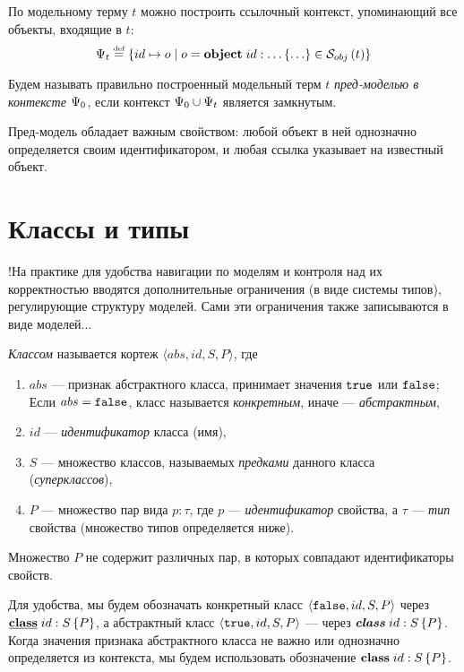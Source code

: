 По модельному терму $t$ можно построить ссылочный контекст, упоминающий все объекты, входящие в $t$:
$$
	\Psi_t \stackrel{\text{\tiny def}}{=} \left\{ id \mapsto o \;|\; o = \mathbf{object}\;id : \ldots\left\{ \ldots \right\} \in \mathcal{S}_{obj}\left(t\right)\right\}
$$

\begin{Def}
Будем называть правильно построенный модельный терм $t$ \emph{пред-моделью в контексте $\Psi_0$}, если контекст $\Psi_0 \cup \Psi_t$ является замкнутым.
\end{Def}

Пред-модель обладает важным свойством: любой объект в ней однозначно определяется своим идентификатором, и любая ссылка указывает на известный объект.

\section{Классы и типы}

!На практике для удобства навигации по моделям и контроля над их корректностью вводятся дополнительные ограничения (в виде системы типов), регулирующие структуру моделей. Сами эти ограничения также записываются в виде моделей...

\begin{Def}[Класс]
\emph{Классом} называется кортеж $\langle abs, id, S, P \rangle$, где 
\begin{enumerate}
\item $abs$ --- признак абстрактного класса, принимает значения $\mathtt{true}$ или $\mathtt{false}$; Если $abs = \mathtt{false}$, класс называется \emph{конкретным}, иначе --- \emph{абстрактным},
\item $id$ --- \emph{идентификатор} класса (имя),
\item $S$ --- множество классов, называемых \emph{предками} данного класса (\emph{суперклассов}),
\item $P$ --- множество пар вида $p : \tau$, где $p$ --- \emph{идентификатор} свойства, а $\tau$ --- \emph{тип} свойства (множество типов определяется ниже).
\end{enumerate}
Множество $P$ не содержит различных пар, в которых совпадают идентификаторы свойств.
\end{Def}

Для удобства, мы будем обозначать конкретный класс $\langle \mathtt{false}, id, S, P \rangle$ через \mbox{$\underline{\mathbf{class}}\;id : S \left\{P\right\}$}, а абстрактный класс $\langle \mathtt{true}, id, S, P \rangle$ --- через \mbox{$\mbox{\textbf{\textit{class}}}\;id : S \left\{P\right\}$}. Когда значения признака абстрактного класса не важно или однозначно определяется из контекста, мы будем использовать обозначение \mbox{$\mathbf{class}\;id : S \left\{P\right\}$}.

